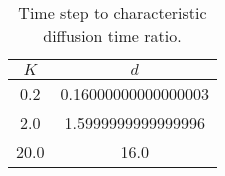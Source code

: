 \begin{table}[htbp]
	 \centering
	 \caption{Time step to characteristic diffusion time ratio.}
	 \begin{tabular}{cc}
		 \toprule
		 $K$ & $d$ \\ 
		 \midrule 
		 0.2 & 0.16000000000000003 \\ 
		 2.0 & 1.5999999999999996 \\ 
		 20.0 & 16.0 \\ 
		 \bottomrule 
	 \end{tabular} 
	 \label{tab:diff ratio} 
\end{table}